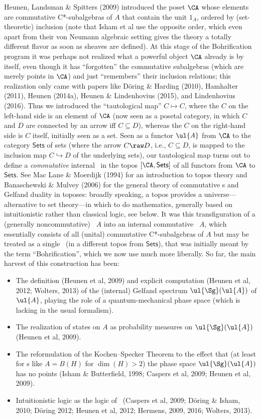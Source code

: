 \documentclass[12pt]{article}
\begin{document}
Heunen, Landsman \& Spitters (2009) introduced the poset $\CA$ whose elements are  commutative C*-subalgebras of $A$ that contain the unit $1_A$, ordered by (set-theoretic) inclusion (note that Isham et al use the opposite order, which even apart from their von Neumann algebraic setting gives the theory a totally different flavor as soon as sheaves are defined).
  At this stage of the Bohrification program it was perhaps not  realized what a powerful object $\CA$ already  is by itself, even though it has ``forgotten'' the commutative subalgebras (which are merely points in $\CA$) and just ``remembers'' their inclusion relations; this realization only came with papers like D\"{o}ring \& Harding (2010),  Hamhalter (2011), Heunen (2014a),
    Heunen \& Lindenhovius (2015), and  Lindenhovius (2016). 
      Thus we introduced the ``tautological map'' $C\mapsto C$, where the $C$ on the left-hand side is an element of $\CA$ (now seen as a posetal category, in which $C$ and $D$ are connected by an arrow iff $C\subseteq D$), whereas the $C$ on the right-hand side is $C$ itself, initially seen as a set. Seen as a functor $\ul{A}$ from $\CA$ to the category $\mathsf{Sets}$ of sets (where the arrow $C\raw D$, i.e., $C\subseteq D$, is mapped to the inclusion map $C\hookrightarrow D$ of the underlying sets), 
our tautological map turns out to define a \emph{commutative} internal \ca\ in the topos $[\CA,\mathsf{Sets}]$
 of all functors from $\CA$ to $\mathsf{Sets}$. See Mac Lane \& Moerdijk (1994) for an introduction to topos theory and Banaschewski \& Mulvey (2006) for the general theory of commutative \ca s and Gelfand duality in toposes: broadly speaking, a topos provides a universe---alternative to set theory---in which to do mathematics, generally based on intuitionistic rather than classical logic, see below. It was this transfiguration of a (generally noncommutative) \ca\ $A$ into an internal commutative \ca\ $A$, which essentially consists of all (unital) commutative C*-subalgebras of $A$ but may be treated as a single \ca\ (in a different topos from $\mathsf{Sets}$),  that was initially meant by the term ``Bohrification'', which we now use much more liberally. So far, the main harvest of this construction has been:
 \begin{itemize}
\item The definition (Heunen et al, 2009) and explicit computation (Heunen et al, 2012; Wolters, 2013) of the (internal) Gelfand spectrum $\ul{\Sg}(\ul{A})$ of $\ul{A}$,  playing the role of a quantum-mechanical phase space (which is lacking in the usual formalism).
\item The realization of states on $A$ as probability measures on  $\ul{\Sg}(\ul{A})$  (Heunen et al, 2009).
\item The reformulation of the Kochen--Specker Theorem to the effect that (at least for \ca s like $A=B(H)$ for $\dim(H)>2$) 
the phase space $\ul{\Sg}(\ul{A})$ has no points (Isham \& Butterfield, 1998; Caspers et al, 2009; Heunen et al, 2009).
\item Intuitionistic logic as the logic of \qm\ (Caspers et al, 2009;  D\"{o}ring \& Isham, 2010; 
D\"{o}ring 2012; Heunen et al, 2012; Hermens, 2009, 2016; Wolters, 2013).
\end{itemize}
\end{document}

